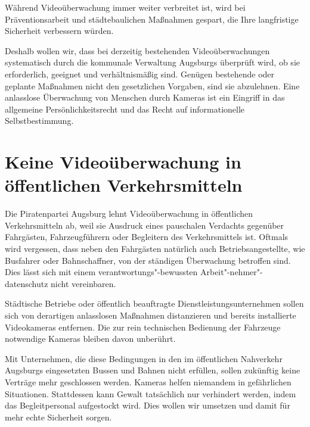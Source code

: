  Während Videoüberwachung immer weiter verbreitet ist, wird bei 
  Präventionsarbeit und städtebaulichen Maßnahmen gespart, die Ihre 
  langfristige Sicherheit verbessern würden.
  
  Deshalb wollen wir, dass bei derzeitig bestehenden Videoüberwachungen 
  systematisch durch die kommunale Verwaltung Augsburgs überprüft wird, ob sie 
  erforderlich, geeignet und verhältnismäßig sind. Genügen bestehende oder 
  geplante Maßnahmen nicht den gesetzlichen Vorgaben, sind sie abzulehnen. 
  Eine anlasslose Überwachung von Menschen durch Kameras ist ein Eingriff in 
  das allgemeine Persönlichkeitsrecht und das Recht auf informationelle 
  Selbstbestimmung. 
  
  \section{Keine Videoüberwachung in öffentlichen Verkehrsmitteln}
  
  Die Piratenpartei Augsburg lehnt Videoüberwachung in öffentlichen 
  Verkehrsmitteln ab, weil sie Ausdruck eines pauschalen Verdachts gegenüber 
  Fahrgästen, Fahrzeugführern oder Begleitern des Verkehrsmittels ist. Oftmals 
  wird vergessen, dass neben den Fahrgästen natürlich auch Betriebsangestellte,
  wie Busfahrer oder Bahnschaffner, von der ständigen Überwachung betroffen 
  sind. Dies lässt sich mit einem verantwortungs"-bewussten 
  Arbeit"-nehmer"-daten\-schutz nicht vereinbaren.
  
  Städtische Betriebe oder öffentlich beauftragte Dienstleistungsunternehmen 
  sollen sich von derartigen anlasslosen Maßnahmen distanzieren und bereits 
  installierte Videokameras entfernen. Die zur rein technischen Bedienung der 
  Fahrzeuge notwendige Kameras bleiben davon unberührt.
  
  Mit Unternehmen, die diese Bedingungen in den im öffentlichen Nahverkehr 
  Augsburgs eingesetzten Bussen und Bahnen nicht erfüllen, sollen zukünftig 
  keine Verträge mehr geschlossen werden. Kameras helfen niemandem in 
  gefährlichen Situationen. Stattdessen kann Gewalt tatsächlich nur verhindert 
  werden, indem das Begleitpersonal aufgestockt wird. Dies wollen wir umsetzen 
  und damit für mehr echte Sicherheit sorgen.